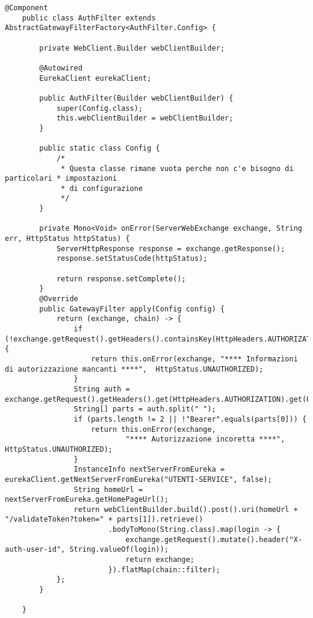 \begin{lstlisting}[style = Java, caption = {Implementazione della classe \textit{AuthFilter}}]
    @Component
    public class AuthFilter extends AbstractGatewayFilterFactory<AuthFilter.Config> {
    
        private WebClient.Builder webClientBuilder;
    
        @Autowired
        EurekaClient eurekaClient;
    
        public AuthFilter(Builder webClientBuilder) {
            super(Config.class);
            this.webClientBuilder = webClientBuilder;
        }
    
        public static class Config {
            /*
             * Questa classe rimane vuota perche non c'e bisogno di particolari * impostazioni
             * di configurazione
             */
        }
    
        private Mono<Void> onError(ServerWebExchange exchange, String err, HttpStatus httpStatus) {
            ServerHttpResponse response = exchange.getResponse();
            response.setStatusCode(httpStatus);
    
            return response.setComplete();
        }
        @Override
        public GatewayFilter apply(Config config) {
            return (exchange, chain) -> {
                if (!exchange.getRequest().getHeaders().containsKey(HttpHeaders.AUTHORIZATION)) {
                    return this.onError(exchange, "**** Informazioni di autorizzazione mancanti ****",  HttpStatus.UNAUTHORIZED);
                }
                String auth = exchange.getRequest().getHeaders().get(HttpHeaders.AUTHORIZATION).get(0);
                String[] parts = auth.split(" ");
                if (parts.length != 2 || !"Bearer".equals(parts[0])) {
                    return this.onError(exchange, 
                            "**** Autorizzazione incoretta ****", HttpStatus.UNAUTHORIZED);
                }
                InstanceInfo nextServerFromEureka = eurekaClient.getNextServerFromEureka("UTENTI-SERVICE", false);
                String homeUrl = nextServerFromEureka.getHomePageUrl();
                return webClientBuilder.build().post().uri(homeUrl + "/validateToken?token=" + parts[1]).retrieve()
                        .bodyToMono(String.class).map(login -> {
                            exchange.getRequest().mutate().header("X-auth-user-id", String.valueOf(login));
                            return exchange;
                        }).flatMap(chain::filter);
            };
        }
    
    }
\end{lstlisting}